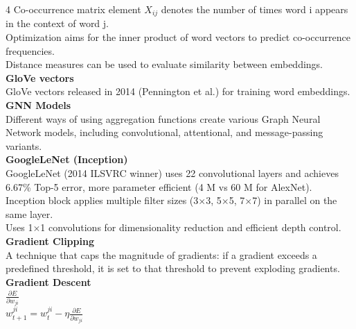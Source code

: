 \documentclass[8pt]{extarticle}
\begin{document}
\begin{multicols}{4}
Co-occurrence matrix element $X_{ij}$ denotes the number of times word i appears in the context of word j.\\
Optimization aims for the inner product of word vectors to predict co-occurrence frequencies.\\
Distance measures can be used to evaluate similarity between embeddings.\\
\vspace{2pt}\textbf{GloVe vectors}\\
GloVe vectors released in 2014 (Pennington et al.) for training word embeddings.\\
\vspace{2pt}\textbf{GNN Models}\\
Different ways of using aggregation functions create various Graph Neural Network models, including convolutional, attentional, and message-passing variants.\\
\vspace{2pt}\textbf{GoogleLeNet (Inception)}\\
GoogleLeNet (2014 ILSVRC winner) uses 22 convolutional layers and achieves 6.67\% Top-5 error, more parameter efficient (4 M vs 60 M for AlexNet).\\
Inception block applies multiple filter sizes (3$\times$3, 5$\times$5, 7$\times$7) in parallel on the same layer.\\
Uses 1$\times$1 convolutions for dimensionality reduction and efficient depth control.\\
\vspace{2pt}\textbf{Gradient Clipping}\\
A technique that caps the magnitude of gradients: if a gradient exceeds a predefined threshold, it is set to that threshold to prevent exploding gradients.\\
\vspace{2pt}\textbf{Gradient Descent}\\
$\frac{\partial E}{\partial w_{ji}}$\\
$w_{t+1}^{ji} = w_t^{ji} - \eta \frac{\partial E}{\partial w_{ji}}$\\


\end{multicols}
\end{document}
